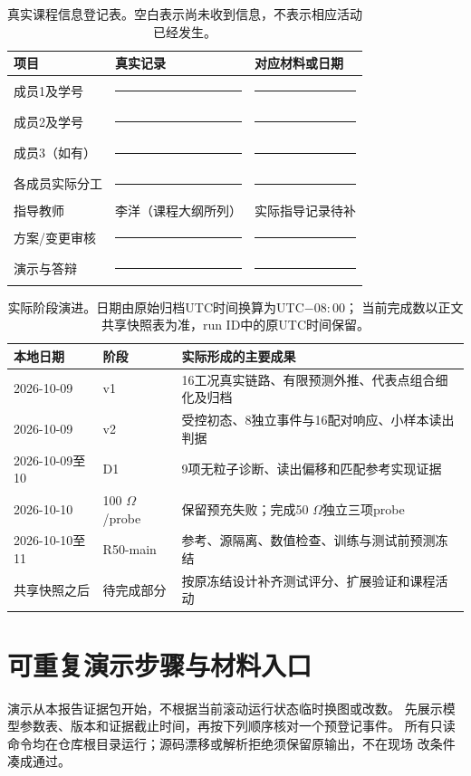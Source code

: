 \begin{table}[H]
\centering\small
\caption{真实课程信息登记表。空白表示尚未收到信息，不表示相应活动已经发生。}
\begin{tabularx}{\textwidth}{lXX}
\toprule
项目&真实记录&对应材料或日期\\
\midrule
成员1及学号&\rule{4cm}{0.4pt}&\rule{4cm}{0.4pt}\\
成员2及学号&\rule{4cm}{0.4pt}&\rule{4cm}{0.4pt}\\
成员3（如有）&\rule{4cm}{0.4pt}&\rule{4cm}{0.4pt}\\
各成员实际分工&\rule{4cm}{0.4pt}&\rule{4cm}{0.4pt}\\
指导教师&李洋（课程大纲所列）&实际指导记录待补\\
方案/变更审核&\rule{4cm}{0.4pt}&\rule{4cm}{0.4pt}\\
演示与答辩&\rule{4cm}{0.4pt}&\rule{4cm}{0.4pt}\\
\bottomrule
\end{tabularx}
\end{table}

\begin{table}[H]
\centering\small
\caption{实际阶段演进。日期由原始归档UTC时间换算为UTC$-08{:}00$；
当前完成数以正文共享快照表为准，run ID中的原UTC时间保留。}
\begin{tabularx}{\textwidth}{llX}
\toprule
本地日期&阶段&实际形成的主要成果\\
\midrule
2026-10-09&v1&16工况真实链路、有限预测外推、代表点组合细化及归档\\
2026-10-09&v2&受控初态、8独立事件与16配对响应、小样本读出判据\\
2026-10-09至10&D1&9项无粒子诊断、读出偏移和匹配参考实现证据\\
2026-10-10&100 $\Omega$/probe&保留预充失败；完成50 $\Omega$独立三项probe\\
2026-10-10至11&R50-main&参考、源隔离、数值检查、训练与测试前预测冻结\\
共享快照之后&待完成部分&按原冻结设计补齐测试评分、扩展验证和课程活动\\
\bottomrule
\end{tabularx}
\end{table}

\clearpage
\section{可重复演示步骤与材料入口}
演示从本报告证据包开始，不根据当前滚动运行状态临时换图或改数。
先展示模型参数表、版本和证据截止时间，再按下列顺序核对一个预登记事件。
所有只读命令均在仓库根目录运行；源码漂移或解析拒绝须保留原输出，不在现场
改条件凑成通过。

